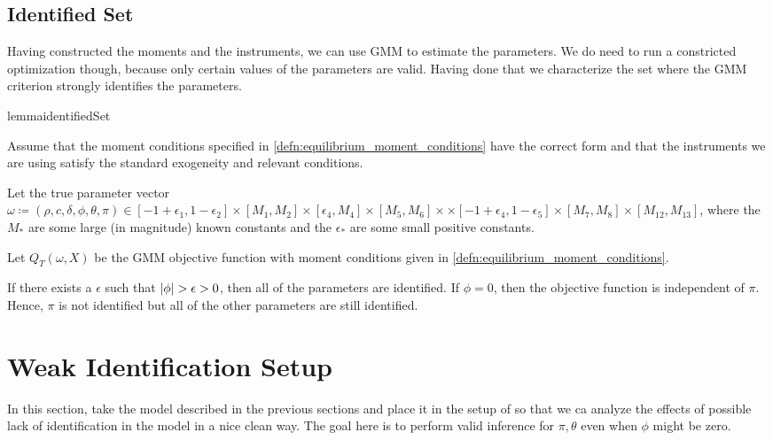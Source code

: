 \documentclass[11pt, letterpaper, twoside, final]{article}
\begin{document}

\subsection{Identified Set}\label{sec:identified_set}

Having constructed the moments and the instruments, we can use GMM to estimate the parameters. We do need to run a constricted optimization though, because only certain values of the parameters are valid.  Having done that we characterize the set where the GMM criterion strongly identifies the parameters.

\begin{restatable}{lemma}{identifiedSet}

  Assume that the moment conditions specified in \cref{defn:equilibrium_moment_conditions} have the correct form
  and that the instruments we are using satisfy the standard exogeneity and relevant conditions. 

  Let the true parameter vector $\omega \coloneqq (\rho, c, \delta, \phi, \theta, \pi) \in [-1+\epsilon_1,
  1 - \epsilon_2] \times [M_1, M_2] \times [\epsilon_4, M_4]\times [M_5, M_6]\times \times [-1 +
  \epsilon_4, 1 - \epsilon_5] \times [M_7, M_8] \times [M_12, M_13]$, where the $M_{\ast}$ are some large (in
  magnitude) known constants and the $\epsilon_{\ast}$ are some small positive constants. 

  Let $Q_T(\omega, X)$ be the GMM objective function with moment conditions given in
  \cref{defn:equilibrium_moment_conditions}. 

  If there exists a $\epsilon$ such that $\lvert\phi\rvert > \epsilon > 0$, then all of the parameters are identified. 
  If $\phi = 0$, then the objective function is independent of $\pi$. 
  Hence, $\pi$ is not identified but all of the other parameters are still identified.

\end{restatable}



\section{Weak Identification Setup}

In this section, take the model described in the previous sections and place it in the setup of \textcite{andrews2014Gmm} so that we ca analyze the effects of possible lack of identification in the model in a nice clean way. The goal here is to perform valid inference for $\pi, \theta$ even when $\phi$ might be zero. 
\end{document}
